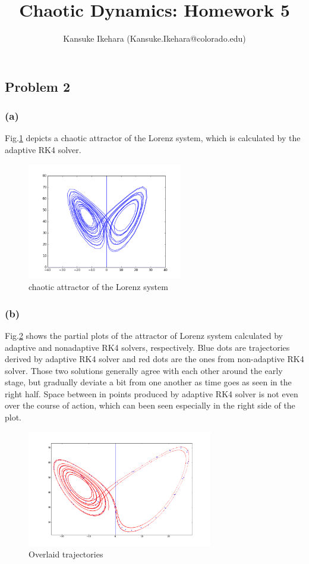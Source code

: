 \documentclass{article}
\title{Chaotic Dynamics: Homework 5}
\author{Kansuke Ikehara (Kansuke.Ikehara@colorado.edu)}
\begin{document}
\maketitle

\subsection*{Problem 2}
\subsubsection*{(a)}
Fig.\ref{q2a} depicts a chaotic attractor of the Lorenz system, which is calculated by the adaptive RK4 solver.
\begin{figure}[h]
  \centering
  \includegraphics[height=2in]{figs/q2a/adaptive_1_n500.png}
  \caption{chaotic attractor of the Lorenz system}
  \label{q2a}
\end{figure}

\subsubsection*{(b)}
Fig.\ref{q2b} shows the partial plots of the attractor of Lorenz system calculated by adaptive and nonadaptive RK4 solvers, respectively. Blue dots are trajectories derived by adaptive RK4 solver and red dots are the ones from non-adaptive RK4 solver. Those two solutions generally agree with each other around the early stage, but gradually deviate a bit from one another as time goes as seen in the right half. Space between in points produced by adaptive RK4 solver is not even over the course of action, which can been seen especially in the right side of the plot.
\begin{figure}[h] 
  \centering
  \includegraphics[height=2in]{figs/q2b/q2_b_comparison2.png}
  \caption{Overlaid trajectories}
  \label{q2b}
\end{figure}
\end{document}
